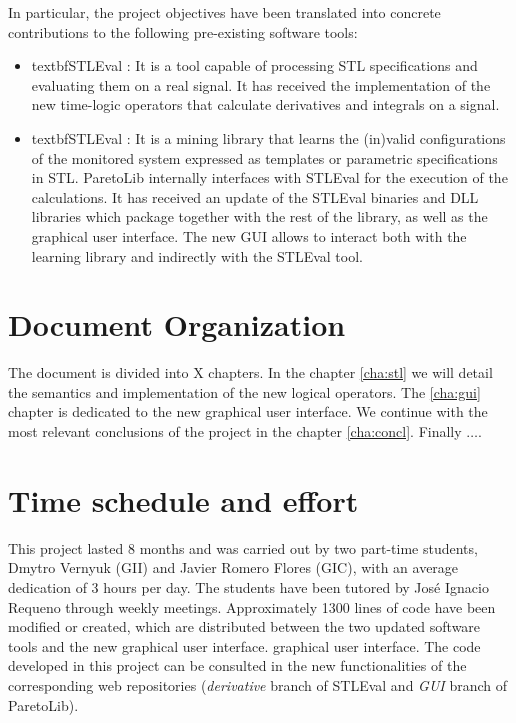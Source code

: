 In particular, the project objectives have been translated into concrete contributions to the following pre-existing software tools:

\begin{itemize}
\item textbf{STLEval} \cite{StlEval}: It is a tool capable of processing STL specifications and evaluating them on a real signal. It has received the implementation of the new time-logic operators that calculate derivatives and integrals on a signal.
\item textbf{STLEval} \cite{StlEval}: It is a mining library that learns the (in)valid configurations of the monitored system expressed as templates or parametric specifications in STL.
ParetoLib internally interfaces with STLEval for the execution of the calculations. It has received an update of the STLEval binaries and DLL libraries which package together with the rest of the library, as well as the graphical user interface. The new GUI allows to interact both with the learning library and indirectly with the STLEval tool.
\end{itemize}

\section{Document Organization}

The document is divided into X chapters. In the chapter \ref{cha:stl} we will detail the semantics and implementation of the new logical operators. The \ref{cha:gui} chapter is dedicated to the new graphical user interface. We continue with the most relevant conclusions of the project in the chapter \ref{cha:concl}. Finally $\ldots$.

\section{Time schedule and effort}
This project lasted 8 months and was carried out by two part-time students, Dmytro Vernyuk (GII) and Javier Romero Flores (GIC), with an average dedication of 3 hours per day. The students have been tutored by José Ignacio Requeno through weekly meetings. Approximately 1300 lines of code have been modified or created, which are distributed between the two updated software tools and the new graphical user interface.
graphical user interface. The code developed in this project can be consulted in the new functionalities of the corresponding web repositories (\textit{derivative} branch of STLEval and \textit{GUI} branch of ParetoLib).

